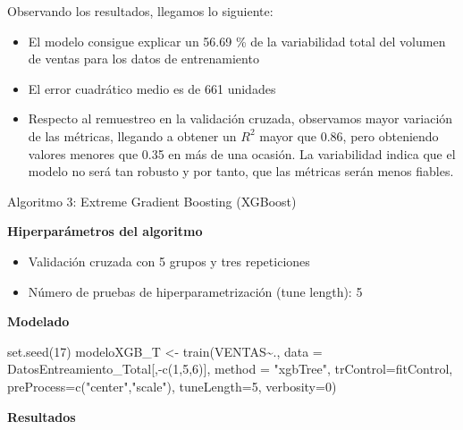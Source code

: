 \documentclass[
]{article}
\newenvironment{Shaded}{\begin{snugshade}}{\end{snugshade}}
\newcommand{\AttributeTok}[1]{\textcolor[rgb]{0.77,0.63,0.00}{#1}}
\newcommand{\DecValTok}[1]{\textcolor[rgb]{0.00,0.00,0.81}{#1}}
\newcommand{\FunctionTok}[1]{\textcolor[rgb]{0.00,0.00,0.00}{#1}}
\newcommand{\NormalTok}[1]{#1}
\newcommand{\OtherTok}[1]{\textcolor[rgb]{0.56,0.35,0.01}{#1}}
\newcommand{\SpecialCharTok}[1]{\textcolor[rgb]{0.00,0.00,0.00}{#1}}
\newcommand{\StringTok}[1]{\textcolor[rgb]{0.31,0.60,0.02}{#1}}
\providecommand{\tightlist}{%
  \setlength{\itemsep}{0pt}\setlength{\parskip}{0pt}}
\begin{document}
Observando los resultados, llegamos lo siguiente:

\begin{itemize}
\tightlist
\item
  El modelo consigue explicar un 56.69 \% de la variabilidad total del
  volumen de ventas para los datos de entrenamiento
\item
  El error cuadrático medio es de 661 unidades
\item
  Respecto al remuestreo en la validación cruzada, observamos mayor
  variación de las métricas, llegando a obtener un \(R^2\) mayor que
  0.86, pero obteniendo valores menores que 0.35 en más de una ocasión.
  La variabilidad indica que el modelo no será tan robusto y por tanto,
  que las métricas serán menos fiables.
\end{itemize}

Algoritmo 3: Extreme Gradient Boosting (XGBoost)

\textbf{Hiperparámetros del algoritmo}

\begin{itemize}
\tightlist
\item
  Validación cruzada con 5 grupos y tres repeticiones
\item
  Número de pruebas de hiperparametrización (tune length): 5
\end{itemize}

\textbf{Modelado}

\begin{Shaded}
\begin{Highlighting}[]
\FunctionTok{set.seed}\NormalTok{(}\DecValTok{17}\NormalTok{)}
\NormalTok{modeloXGB\_T }\OtherTok{\textless{}{-}} \FunctionTok{train}\NormalTok{(VENTAS}\SpecialCharTok{\textasciitilde{}}\NormalTok{., }
                \AttributeTok{data =}\NormalTok{ DatosEntreamiento\_Total[,}\SpecialCharTok{{-}}\FunctionTok{c}\NormalTok{(}\DecValTok{1}\NormalTok{,}\DecValTok{5}\NormalTok{,}\DecValTok{6}\NormalTok{)], }
                \AttributeTok{method =} \StringTok{"xgbTree"}\NormalTok{,}
                \AttributeTok{trControl=}\NormalTok{fitControl, }
                \AttributeTok{preProcess=}\FunctionTok{c}\NormalTok{(}\StringTok{"center"}\NormalTok{,}\StringTok{"scale"}\NormalTok{),}
                \AttributeTok{tuneLength=}\DecValTok{5}\NormalTok{, }\AttributeTok{verbosity=}\DecValTok{0}\NormalTok{)}
\end{Highlighting}
\end{Shaded}

\textbf{Resultados}
\end{document}
